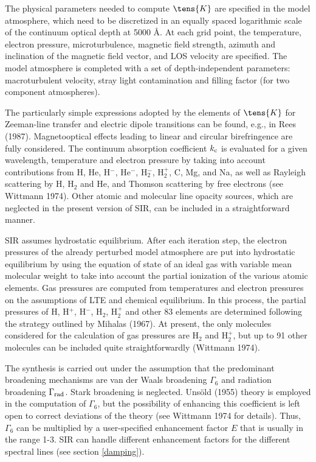 The physical parameters needed to compute $\tens{K}$ are specified in
the model atmosphere, which need to be discretized in an equally
spaced logarithmic scale of the continuum optical depth at 5000 \AA\/.
At each grid point, the temperature, electron pressure,
microturbulence, magnetic field strength, azimuth and inclination of
the magnetic field vector, and LOS velocity are specified. The model
atmosphere is completed with a set of depth-independent parameters:
macroturbulent velocity, stray light contamination and filling factor
(for two component atmospheres).

The particularly simple expressions adopted by the elements of
$\tens{K}$ for Zeeman-line transfer and electric dipole transitions can
be found, e.g., in Rees (1987). Magnetooptical effects leading to
linear and circular birefringence are fully considered. The continuum
absorption coefficient $k_{\rm c}$ is evaluated for a given wavelength,
temperature and electron pressure by taking into account
contributions from H, He, H$^{-}$, He$^{-}$, H$_2^-$, H$_2^+$, C, Mg,
and Na, as well as Rayleigh scattering by H, H$_2$ and He, and Thomson
scattering by free electrons (see Wittmann 1974).  Other atomic and
molecular line opacity sources, which are neglected in the present
version of SIR, can be included in a straightforward manner.

SIR assumes hydrostatic equilibrium. After each iteration step, the 
electron pressures of the already perturbed model atmosphere are put into 
hydrostatic equilibrium by using the equation of state of
an ideal gas with variable mean molecular weight to take into account
the partial ionization of the various atomic elements. Gas pressures
are computed from temperatures and electron pressures on the
assumptions of LTE and chemical equilibrium. In this process, the
partial pressures of H, H$^+$, H$^-$, H$_2$, H$_2^+$ and other 83
elements  are determined following the strategy outlined by Mihalas
(1967). At present, the only molecules considered for the calculation
of gas pressures are H$_2$ and H$_2^+$, but up to 91 other molecules can
be included quite straightforwardly (Wittmann 1974).

The synthesis is carried out under the assumption that the predominant
broadening mechanisms are van der Waals broadening $\Gamma_6$ and
radiation broadening $\Gamma_{\rm rad}$. Stark broadening is
neglected.  Uns\"old (1955) theory is employed in the computation of
$\Gamma_6$, but the possibility of enhancing this coefficient is left
open to correct deviations of the theory (see Wittmann 1974 for
details). Thus, $\Gamma_6$ can be multiplied by a user-specified
enhancement factor $E$ that is usually in the range 1-3. SIR can handle
different enhancement factors for the different spectral lines (see 
section \ref{damping}).

